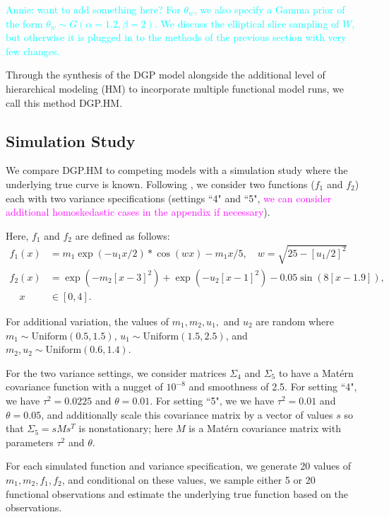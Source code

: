 \documentclass[11pt]{article}
\begin{document}
\textcolor{cyan}{Annie: want to add something here? For $\theta_w$, we also specify a Gamma prior of the form $\theta_w \sim G(\alpha=1.2, \beta=2)$. We discuss the elliptical slice sampling of $W$, but otherwise it is plugged in to the methods of the previous section with very few changes.}

Through the synthesis of the DGP model alongside the additional level of hierarchical modeling (HM) to incorporate multiple functional model runs, we call this method DGP.HM.

\subsection{Simulation Study}
\label{subsec:sim}

We compare DGP.HM to competing models with a simulation study where the underlying true curve is known. Following \cite{moran2024dpc}, we consider two functions ($f_1$ and $f_2$) each with two variance specifications (settings ``4" and ``5", \textcolor{magenta}{we can consider additional homoskedastic cases in the appendix if necessary}). 

Here, $f_1$ and $f_2$ are defined as follows:
\begin{align}
  f_1(x) &= m_1 \exp(-u_1x/2) * \cos(wx) - m_1x/5, \quad w=\sqrt{25-[u_1/2]^2} \\
  f_2(x) &= \exp(-m_2[x-3]^2)+\exp(-u_2[x-1]^2)-0.05\sin(8[x-1.9]), \\ 
  \quad x &\in [0,4].
\end{align}

For additional variation, the values of $m_1, m_2, u_1,$ and $u_2$ are random where $m_1 \sim \text{Uniform}(0.5,1.5)$, $u_1 \sim \text{Uniform}(1.5,2.5)$, and $m_2,u_2 \sim \text{Uniform}(0.6,1.4)$. 
      
For the two variance settings, we consider matrices $\Sigma_4$ and $\Sigma_5$ to have a Mat\'ern covariance function with a nugget of $10^{-8}$ and smoothness of 2.5. For setting ``4", we have $\tau^2=0.0225$ and $\theta=0.01$. For setting ``5", we we have $\tau^2=0.01$ and $\theta=0.05$, and additionally scale this covariance matrix by a vector of values $s$ so that $\Sigma_5 = s M s^T$ is nonstationary; here $M$ is a Mat\'ern covariance matrix with parameters $\tau^2$ and $\theta$.

For each simulated function and variance specification, we generate 20 values of $m_1, m_2, f_1, f_2$, and conditional on these values, we sample either 5 or 20 functional observations and estimate the underlying true function based on the observations.
\end{document}
